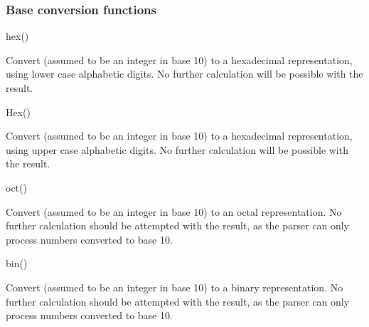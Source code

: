 \subsubsection{Base conversion functions}

\label{pgfmath-functions-base}

\begin{math-function}{hex()}
\mathcommand

  Convert  (assumed to be an integer in base 10) to a
  hexadecimal representation, using lower case alphabetic digits.
	No further calculation will be possible with the result.
	
\begin{codeexample}[]
 \pgfmathresult
\end{codeexample}
\end{math-function}

\begin{math-function}{Hex()}
\mathcommand

  Convert  (assumed to be an integer in base 10) to a
  hexadecimal representation, using upper case alphabetic digits.
  No further calculation will be possible with the result.

\begin{codeexample}[]
 \pgfmathresult
\end{codeexample}
\end{math-function}

\begin{math-function}{oct()}
\mathcommand

  Convert  (assumed to be an integer in base 10) to an
  octal representation.
  No further calculation should be attempted with the result, as
  the parser can only process numbers converted to base 10.
\begin{codeexample}[]
 \pgfmathresult
\end{codeexample}
\end{math-function}

\begin{math-function}{bin()}
\mathcommand

  Convert  (assumed to be an integer in base 10) to a
  binary representation.
  No further calculation should be attempted with the result, as
  the parser can only process numbers converted to base 10.

\begin{codeexample}[]
 \pgfmathresult
\end{codeexample}
\end{math-function}

